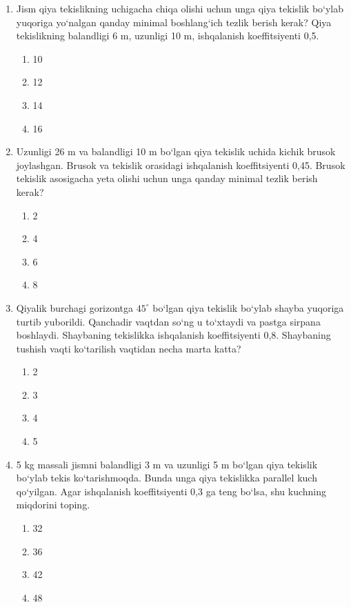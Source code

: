 \begin{enumerate}
\item Jism qiya tekislikning uchigacha
chiqa olishi uchun unga qiya tekislik
bo‘ylab yuqoriga yo‘nalgan qanday minimal
boshlang‘ich tezlik berish kerak?
Qiya tekislikning balandligi 6 m,
uzunligi 10 m,
ishqalanish koeffitsiyenti 0,5.

\begin{enumerate}[label=\Alph*)]
\item 10
\item 12
\item 14
\item 16
\end{enumerate}

\item Uzunligi 26 m va balandligi 10 m
bo‘lgan qiya tekislik uchida
kichik brusok joylashgan.
Brusok va tekislik orasidagi
ishqalanish koeffitsiyenti 0,45.
Brusok tekislik asosigacha
yeta olishi uchun unga
qanday minimal tezlik berish kerak?

\begin{enumerate}[label=\Alph*)]
\item 2
\item 4
\item 6
\item 8
\end{enumerate}

\item Qiyalik burchagi gorizontga
$45^\circ$ bo‘lgan qiya tekislik bo‘ylab
shayba yuqoriga turtib yuborildi.
Qanchadir vaqtdan so‘ng u to‘xtaydi
va pastga sirpana boshlaydi.
Shaybaning tekislikka ishqalanish
koeffitsiyenti 0,8.
Shaybaning tushish vaqti
ko‘tarilish vaqtidan
necha marta katta?

\begin{enumerate}[label=\Alph*)]
\item 2
\item 3
\item 4
\item 5
\end{enumerate}

\item 5 kg massali jismni
balandligi 3 m va uzunligi 5 m
bo‘lgan qiya tekislik bo‘ylab
tekis ko‘tarishmoqda.
Bunda unga qiya tekislikka
parallel kuch qo‘yilgan.
Agar ishqalanish koeffitsiyenti
0,3 ga teng bo‘lsa,
shu kuchning miqdorini toping.

\begin{enumerate}[label=\Alph*)]
\item 32
\item 36
\item 42
\item 48
\end{enumerate}


\end{enumerate}
